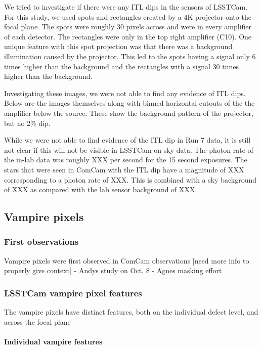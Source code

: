 We tried to investigate if there were any ITL dips in the sensors of
LSSTCam. For this study, we used spots and rectangles created by a 4K
projector onto the focal plane. The spots were roughly 30 pixels across
and were in every amplifier of each detector. The rectangles were only
in the top right amplifier (C10). One unique feature with this spot
projection was that there was a background illumination caused by the
projector. This led to the spots having a signal only 6 times higher
than the background and the rectangles with a signal 30 times higher
than the background.

Investigating these images, we were not able to find any evidence of ITL
dips. Below are the images themselves along with binned horizontal
cutouts of the the amplifier below the source. These show the background
pattern of the projector, but no 2\% dip.

While we were not able to find evidence of the ITL dip in Run 7 data, it
is still not clear if this will not be visible in LSSTCam on-sky data.
The photon rate of the in-lab data was roughly XXX per second for the 15
second exposures. The stars that were seen in ComCam with the ITL dip
have a magnitude of XXX corresponding to a photon rate of XXX. This is
combined with a sky background of XXX as compared with the lab sensor
background of XXX.

\subsection{Vampire pixels}\label{vampire-pixels}

\subsubsection{First observations}\label{first-observations}

Vampire pixels were first observed in ComCam observations {[}need more
info to properly give context{]} - Andy\textquotesingle s study on Oct.
8 - Agnes masking effort

\subsubsection{LSSTCam vampire pixel
features}\label{lsstcam-vampire-pixel-features}

The vampire pixels have distinct features, both on the individual defect
level, and across the focal plane

\paragraph{Individual vampire
features}\label{individual-vampire-features}

